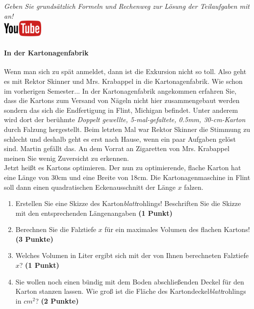 \documentclass[a4paper, 9pt]{scrartcl}\usepackage[]{graphicx}\usepackage[]{xcolor}
\begin{document}
\textit{Geben Sie grunds{\"a}tzlich Formeln und Rechenweg zur L{\"o}sung der
  Teilaufgaben mit an!} \\[1Ex]

\hfill\href{https://youtu.be/RuzMjwvwT-4}{\includegraphics[width =
  2cm]{img/youtube}} %
\hspace{2Ex}

\paragraph{In der Kartonagenfabrik}



Wenn man sich zu sp{\"a}t anmeldet, dann ist die Exkursion nicht so toll. Also
geht es mit Rektor Skinner und Mrs. Krabappel in die Kartonagenfabrik. Wie
schon im vorherigen Semester... In der Kartonagenfabrik angekommen erfahren
Sie, dass die Kartons zum Versand von N{\"a}geln nicht hier zusammengebaut
werden sondern das sich die Endfertigung in Flint, Michigan befindet. Unter
anderem wird dort der ber{\"u}hmte \textit{Doppelt gewellte,
  5-mal-gefaltete, 0.5mm, 30-cm-Karton} durch
Falzung hergestellt. Beim letzten Mal war Rektor Skinner die Stimmung zu
schlecht und deshalb geht es erst nach Hause, wenn ein paar Aufgaben gel{\"o}st
sind. Martin gef{\"a}llt das. An dem Vorrat
an Zigaretten von Mrs. Krabappel meinen Sie wenig Zuversicht zu erkennen.\\

Jetzt hei{\ss}t es Kartons optimieren. Der nun zu optimierende, flache Karton
hat eine L{\"a}nge von 30cm und eine Breite von 18cm. Die
Kartonagenmaschine in Flint soll dann einen quadratischen Eckenausschnitt
der L{\"a}nge $x$ falzen.

\begin{enumerate}
\item Erstellen Sie eine Skizze des Karton\textit{blatt}rohlings!
  Beschriften Sie die Skizze mit den entsprechenden L{\"a}ngenangaben
  \textbf{(1 Punkt)}
\item Berechnen Sie die Falztiefe $x$ f{\"u}r ein maximales Volumen des flachen
  Kartons! \textbf{(3 Punkte)}
\item Welches Volumen in Liter ergibt sich mit der von Ihnen berechneten
  Falztiefe $x$?  \textbf{(1 Punkt)}
\item Sie wollen noch einen b{\"u}ndig mit dem Boden abschlie{\ss}enden Deckel f{\"u}r
  den Karton stanzen lassen. Wie gro{\ss} ist die Fl{\"a}che des
  Kartondeckel\textit{blatt}rohlings in $cm^2$? \textbf{(2 Punkte)}
\end{enumerate}
\end{document}
